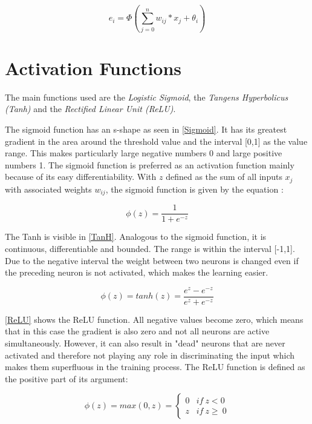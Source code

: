 \begin{equation}
e_i= \Phi \left(\sum_{j=0}^n w_{ij}*x_j + \theta_i\right)
\end{equation}

\section{Activation Functions}
The main functions used are the \textit{Logistic Sigmoid}, the \textit{Tangens Hyperbolicus (Tanh)} and the \textit{Rectified Linear Unit (ReLU)}. 

The sigmoid function has an s-shape as seen in \cref{Sigmoid}. It has its greatest gradient in the area around the threshold value and the interval [0,1] as the value range. This makes particularly large negative numbers 0 and large positive numbers 1. The sigmoid function is preferred as an activation function mainly because of its easy differentiability. With $z$ defined as the sum of all inputs $x_j$ with associated weights $w_{ij}$, the sigmoid function is given by the equation \cite{sigmoid}:


\begin{equation}
    \label{simple_equation}
    \phi(z)=\frac{1}{1+e^{-z}}
\end{equation}

The Tanh is visible in \cref{TanH}. Analogous to the sigmoid function, it is continuous, differentiable and bounded. The range is within the interval [-1,1]. Due to the negative interval the weight between two neurons is changed even if the preceding neuron is not activated, which makes the learning easier.

\begin{equation}
\phi(z)=tanh(z)=\frac{e^z-e^{-z}}{e^z+e^{-z}}
\end{equation}

\cref{ReLU} shows the ReLU function. All negative values become zero, which means that in this case the gradient is also zero and not all neurons are active simultaneously. However, it can also result in "dead" neurons that are never activated and therefore not playing any role in discriminating the input which makes them superfluous in the training process. The ReLU function is defined as the positive part of its argument:

\begin{equation}
\phi(z) = max(0,z)
        =\begin{cases} 
        0 & if~ z < 0 \\
        z & if~ z \geq\ 0
        \end{cases}
\end{equation}

